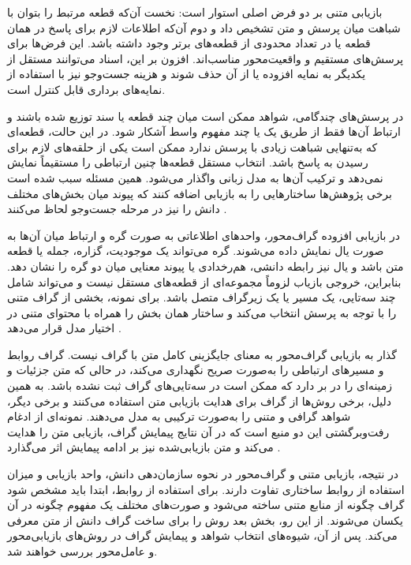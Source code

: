 بازیابی متنی بر دو فرض اصلی استوار است: نخست آن‌که قطعه مرتبط را بتوان با شباهت میان پرسش و متن تشخیص داد و دوم آن‌که اطلاعات لازم برای پاسخ در همان قطعه یا در تعداد محدودی از قطعه‌های برتر وجود داشته باشد. این فرض‌ها برای پرسش‌های مستقیم و واقعیت‌محور مناسب‌اند. افزون بر این، اسناد می‌توانند مستقل از یکدیگر به نمایه افزوده یا از آن حذف شوند و هزینه جست‌وجو نیز با استفاده از نمایه‌های برداری قابل کنترل است.

در پرسش‌های چندگامی، شواهد ممکن است میان چند قطعه یا سند توزیع شده باشند و ارتباط آن‌ها فقط از طریق یک یا چند مفهوم واسط آشکار شود. در این حالت، قطعه‌ای که به‌تنهایی شباهت زیادی با پرسش ندارد ممکن است یکی از حلقه‌های لازم برای رسیدن به پاسخ باشد. انتخاب مستقل قطعه‌ها چنین ارتباطی را مستقیماً نمایش نمی‌دهد و ترکیب آن‌ها به مدل زبانی واگذار می‌شود. همین مسئله سبب شده است برخی پژوهش‌ها ساختارهایی را به بازیابی اضافه کنند که پیوند میان بخش‌های مختلف دانش را نیز در مرحله جست‌وجو لحاظ می‌کنند \cite{ma2025tog2,gutierrez2025hipporag2}.

در بازیابی افزوده گراف‌محور، واحدهای اطلاعاتی به صورت گره و ارتباط میان آن‌ها به صورت یال نمایش داده می‌شوند. گره می‌تواند یک موجودیت، گزاره، جمله یا قطعه متن باشد و یال نیز رابطه دانشی، هم‌رخدادی یا پیوند معنایی میان دو گره را نشان دهد. بنابراین، خروجی بازیاب لزوماً مجموعه‌ای از قطعه‌های مستقل نیست و می‌تواند شامل چند سه‌تایی، یک مسیر یا یک زیرگراف متصل باشد. برای نمونه،  بخشی از گراف متنی را با توجه به پرسش انتخاب می‌کند و ساختار همان بخش را همراه با محتوای متنی در اختیار مدل قرار می‌دهد \cite{he2024gretriever}.

گذار به بازیابی گراف‌محور به معنای جایگزینی کامل متن با گراف نیست. گراف روابط و مسیرهای ارتباطی را به‌صورت صریح نگهداری می‌کند، در حالی که متن جزئیات و زمینه‌ای را در بر دارد که ممکن است در سه‌تایی‌های گراف ثبت نشده باشد. به همین دلیل، برخی روش‌ها از گراف برای هدایت بازیابی متن استفاده می‌کنند و برخی دیگر، شواهد گرافی و متنی را به‌صورت ترکیبی به مدل می‌دهند.  نمونه‌ای از ادغام رفت‌وبرگشتی این دو منبع است که در آن نتایج پیمایش گراف، بازیابی متن را هدایت می‌کند و متن بازیابی‌شده نیز بر ادامه پیمایش اثر می‌گذارد \cite{ma2025tog2}.

در نتیجه، بازیابی متنی و گراف‌محور در نحوه سازمان‌دهی دانش، واحد بازیابی و میزان استفاده از روابط ساختاری تفاوت دارند. برای استفاده از روابط، ابتدا باید مشخص شود گراف چگونه از منابع متنی ساخته می‌شود و صورت‌های مختلف یک مفهوم چگونه در آن یکسان می‌شوند. از این رو، بخش بعد روش  را برای ساخت گراف دانش از متن معرفی می‌کند. پس از آن، شیوه‌های انتخاب شواهد و پیمایش گراف در روش‌های بازیابی‌محور و عامل‌محور بررسی خواهند شد.


